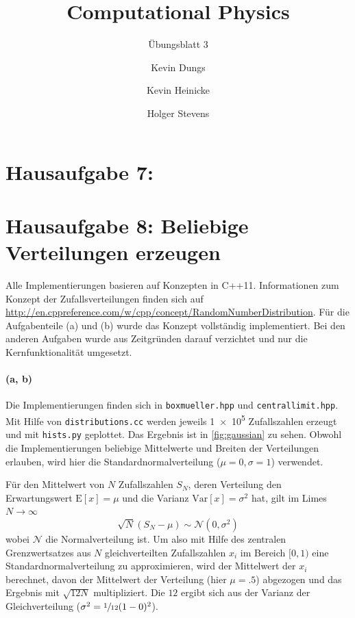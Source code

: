 \documentclass{scrartcl}
\author{Kevin Dungs \and Kevin Heinicke \and Holger Stevens}
\title{Computational Physics}
\subtitle{Übungsblatt 3}
\begin{document}
\maketitle

\section*{Hausaufgabe 7:}


\section*{Hausaufgabe 8: Beliebige Verteilungen erzeugen}
Alle Implementierungen basieren auf Konzepten in C++11. Informationen zum Konzept der Zufallsverteilungen finden sich auf \url{http://en.cppreference.com/w/cpp/concept/RandomNumberDistribution}. Für die Aufgabenteile (a) und (b) wurde das Konzept vollständig implementiert. Bei den anderen Aufgaben wurde aus Zeitgründen darauf verzichtet und nur die Kernfunktionalität umgesetzt.

\paragraph{(a, b)} Die Implementierungen finden sich in \texttt{boxmueller.hpp} und \texttt{centrallimit.hpp}. Mit Hilfe von \texttt{distributions.cc} werden jeweils \num{1e5} Zufallszahlen erzeugt und mit \texttt{hists.py} geplottet. Das Ergebnis ist in \autoref{fig:gaussian} zu sehen. Obwohl die Implementierungen beliebige Mittelwerte und Breiten der Verteilungen erlauben, wird hier die Standardnormalverteilung ($\mu = 0, \sigma = 1$) verwendet.

Für den Mittelwert von $N$ Zufallszahlen $S_N$, deren Verteilung den Erwartungswert $\mathrm{E}[x] = \mu$ und die Varianz $\mathrm{Var}[x] = \sigma^2$ hat, gilt im Limes $N \to \infty$
\begin{equation}
    \sqrt{N}(S_N - \mu) \sim \mathcal{N}(0, \sigma^2)
\end{equation}
wobei $\mathcal{N}$ die Normalverteilung ist. Um also mit Hilfe des zentralen Grenzwertsatzes aus $N$ gleichverteilten Zufallszahlen $x_i$ im Bereich $[0, 1)$ eine Standardnormalverteilung zu approximieren, wird der Mittelwert der $x_i$ berechnet, davon der Mittelwert der Verteilung (hier $\mu = \num{.5}$) abgezogen und das Ergebnis mit $\sqrt{12N}$ multipliziert. Die $12$ ergibt sich aus der Varianz der Gleichverteilung ($\sigma^2 = \sfrac{1}{12}(1 - 0)^2$).
\end{document}
